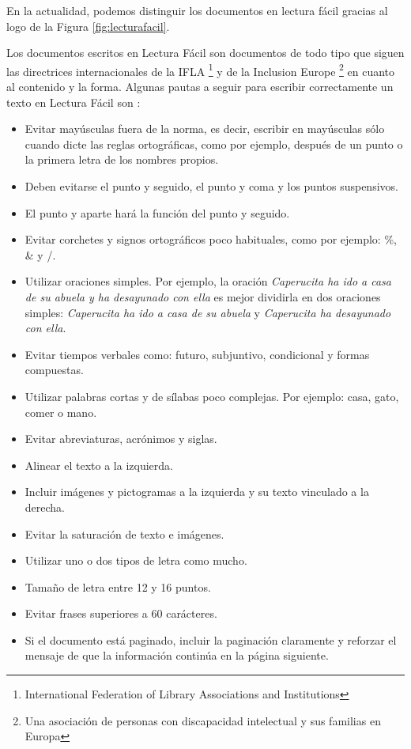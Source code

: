 En la actualidad, podemos distinguir los documentos en lectura fácil gracias al logo de la Figura \ref{fig:lecturafacil}.

	
	
Los documentos escritos en Lectura Fácil \citep{wiki:lecturafacil} son documentos de todo tipo que siguen las directrices internacionales de la IFLA \footnote{International Federation of Library Associations and Institutions} y de la Inclusion Europe \footnote{Una asociación de personas con discapacidad intelectual y sus familias en Europa} en cuanto al contenido y la forma.
Algunas pautas a seguir para escribir correctamente un texto en Lectura Fácil son \citep{GarciaMunoz2012LecturaFacil}:


\begin{itemize}
	\item Evitar mayúsculas fuera de la norma, es decir, escribir en mayúsculas sólo cuando dicte las reglas ortográficas, como por ejemplo, después de un punto o la primera letra de los nombres propios.
	\item Deben evitarse el punto y seguido, el punto y coma y los puntos suspensivos.
	\item El punto y aparte hará la función del punto y seguido.
	\item Evitar corchetes y signos ortográficos poco habituales, como por ejemplo: \%, \& y /.
	\item Utilizar oraciones simples. Por ejemplo, la oración \textit{Caperucita ha ido a casa de su abuela y ha desayunado con ella} es mejor dividirla en dos oraciones simples:\textit{ Caperucita ha ido a casa de su abuela} y  \textit{Caperucita ha desayunado con ella}.
	\item Evitar tiempos verbales como: futuro, subjuntivo, condicional y formas compuestas.
	\item Utilizar palabras cortas y de sílabas poco complejas. 
	Por ejemplo: casa, gato, comer o mano.
	\item Evitar abreviaturas, acrónimos y siglas.
	\item Alinear el texto a la izquierda.
	\item Incluir imágenes y pictogramas a la izquierda y su texto vinculado a la derecha.
	\item Evitar la saturación de texto e imágenes.
	\item Utilizar uno o dos tipos de letra como mucho.
	\item Tamaño de letra entre 12 y 16 puntos.
	\item Evitar frases superiores a 60 carácteres.
	\item Si el documento está paginado, incluir la paginación claramente y reforzar el mensaje de que la información continúa en la página siguiente.
\end{itemize}

